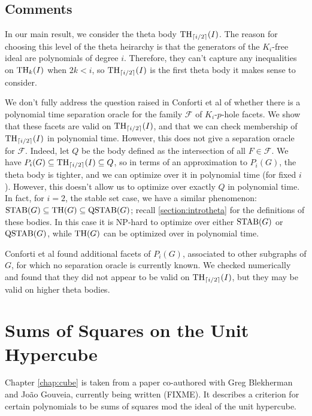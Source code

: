 \subsection{Comments}
In our main result, we consider the theta body $\textup{TH}_{\lceil i/2 \rceil}(I)$. 
The reason for choosing this level of the theta heirarchy is that the generators of the $K_i$-free ideal are polynomials of degree $i$.
Therefore, they can't capture any inequalities on $\textup{TH}_k(I)$ when $2k < i$, so $\textup{TH}_{\lceil i/2 \rceil}(I)$ is the first theta body it makes sense to consider.

We don't fully address the question raised in Conforti et al \cite{conforti} of whether there is a polynomial time separation oracle for the family $\mathcal{F}$ of $K_i$-$p$-hole facets.
We show that these facets are valid on $\textup{TH}_{\lceil i/2\rceil}(I)$, and that we can check membership of $\textup{TH}_{\lceil i/2 \rceil}(I)$ in polynomial time. 
However, this does not give a separation oracle for $\mathcal{F}$.
Indeed, let $Q$ be the body defined as the intersection of all $F \in \mathcal{F}$.
We have $P_i(G) \subseteq \textup{TH}_{\lceil i/2\rceil}(I) \subseteq Q$, so in terms of an approximation to $P_i(G)$, the theta body is tighter, and we can optimize over it in polynomial time (for fixed $i$).
However, this doesn't allow us to optimize over exactly $Q$ in polynomial time.
In fact, for $i=2$, the stable set case, we have a similar phenomenon: $\textup{STAB}(G) \subseteq \textup{TH}(G) \subseteq \textup{QSTAB}(G)$; recall \ref{section:introtheta} for the definitions of these bodies.
In this case it is NP-hard to optimize over either $\textup{STAB}(G)$ or $\textup{QSTAB}(G)$, while $\textup{TH}(G)$ can be optimized over in polynomial time.


Conforti et al \cite{conforti} found additional facets of $P_i(G)$, associated to other subgraphs of $G$, for which no separation oracle is currently known. 
We checked numerically and found that they did not appear to be valid on $\textup{TH}_{\lceil i/2\rceil}(I)$, but they may be valid on higher theta bodies.

\section{Sums of Squares on the Unit Hypercube}
Chapter \ref{chap:cube} is taken from a paper co-authored with Greg Blekherman and Jo\~ao Gouveia, currently being written (FIXME).
It describes a criterion for certain polynomials to be sums of squares mod the ideal of the unit hypercube.

